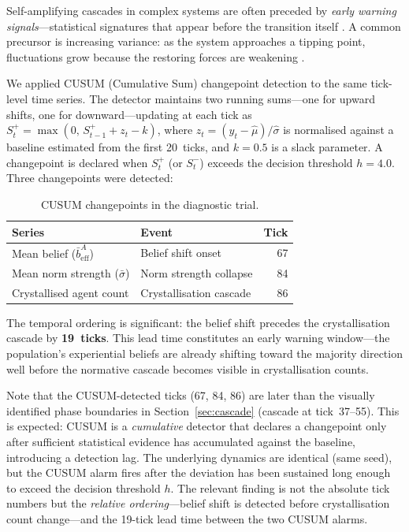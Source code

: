 \documentclass[11pt,a4paper]{article}
\begin{document}
\label{sec:ews}

Self-amplifying cascades in complex systems are often preceded by \emph{early warning signals}---statistical signatures that appear before the transition itself \citep{scheffer2009early}. A common precursor is increasing variance: as the system approaches a tipping point, fluctuations grow because the restoring forces are weakening \citep{dakos2012methods}.

We applied CUSUM (Cumulative Sum) changepoint detection \citep{page1954continuous} to the same tick-level time series. The detector maintains two running sums---one for upward shifts, one for downward---updating at each tick as $S^+_t = \max(0,\, S^+_{t-1} + z_t - k)$, where $z_t = (y_t - \hat\mu)/\hat\sigma$ is normalised against a baseline estimated from the first 20~ticks, and $k = 0.5$ is a slack parameter. A changepoint is declared when $S^+_t$ (or $S^-_t$) exceeds the decision threshold $h = 4.0$. Three changepoints were detected:

\begin{table}[H]
\centering
\caption{CUSUM changepoints in the diagnostic trial.}
\label{tab:changepoints}
\begin{tabular}{@{}llr@{}}
\toprule
Series & Event & Tick \\
\midrule
Mean belief ($\bar{b}_{\mathrm{eff}}^A$) & Belief shift onset & 67 \\
Mean norm strength ($\bar{\sigma}$) & Norm strength collapse & 84 \\
Crystallised agent count & Crystallisation cascade & 86 \\
\bottomrule
\end{tabular}
\end{table}

The temporal ordering is significant: the belief shift precedes the crystallisation cascade by \textbf{19~ticks}. This lead time constitutes an early warning window---the population's experiential beliefs are already shifting toward the majority direction well before the normative cascade becomes visible in crystallisation counts.

Note that the CUSUM-detected ticks (67, 84, 86) are later than the visually identified phase boundaries in Section~\ref{sec:cascade} (cascade at tick~37--55). This is expected: CUSUM is a \emph{cumulative} detector that declares a changepoint only after sufficient statistical evidence has accumulated against the baseline, introducing a detection lag. The underlying dynamics are identical (same seed), but the CUSUM alarm fires after the deviation has been sustained long enough to exceed the decision threshold $h$. The relevant finding is not the absolute tick numbers but the \emph{relative ordering}---belief shift is detected before crystallisation count change---and the 19-tick lead time between the two CUSUM alarms.
\end{document}
